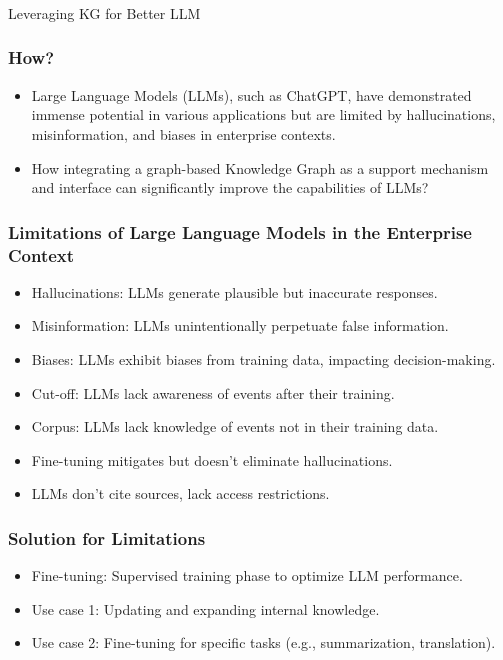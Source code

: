 \begin{frame}[fragile]\frametitle{}
\begin{center}
{\Large Leveraging KG for Better LLM}
\end{center}
\end{frame}

\begin{frame}[fragile]\frametitle{How?}

\begin{itemize}
\item Large Language Models (LLMs), such as ChatGPT, have demonstrated immense potential in various applications but are limited by hallucinations, misinformation, and biases in enterprise contexts.
\item How integrating a graph-based Knowledge Graph as a support mechanism and interface can significantly improve the capabilities of LLMs?
\end{itemize}	

\end{frame}

\begin{frame}[fragile]\frametitle{Limitations of Large Language Models in the Enterprise Context}

\begin{itemize}
\item Hallucinations: LLMs generate plausible but inaccurate responses.
\item Misinformation: LLMs unintentionally perpetuate false information.
\item Biases: LLMs exhibit biases from training data, impacting decision-making.
\item Cut-off: LLMs lack awareness of events after their training.
\item Corpus: LLMs lack knowledge of events not in their training data.
\item Fine-tuning mitigates but doesn't eliminate hallucinations.
\item LLMs don't cite sources, lack access restrictions.
\end{itemize}	

\end{frame}

\begin{frame}[fragile]\frametitle{Solution for Limitations}

\begin{itemize}
\item Fine-tuning: Supervised training phase to optimize LLM performance.
\item Use case 1: Updating and expanding internal knowledge.
\item Use case 2: Fine-tuning for specific tasks (e.g., summarization, translation).
\end{itemize}	

\end{frame}



